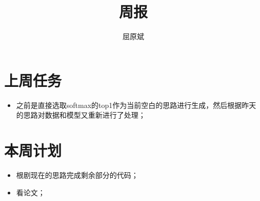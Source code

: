 \documentclass[UTF8]{article}
\title{周报}
\author{屈原斌}
\begin{document}
	\maketitle
	\section{上周任务}
		\begin{itemize}
			\item 之前是直接选取softmax的top1作为当前空白的思路进行生成，然后根据昨天的思路对数据和模型又重新进行了处理；
		\end{itemize}

	\section{本周计划}
		\begin{itemize}
			\item 根剧现在的思路完成剩余部分的代码； 
			\item 看论文；
		\end{itemize}
\end{document}
